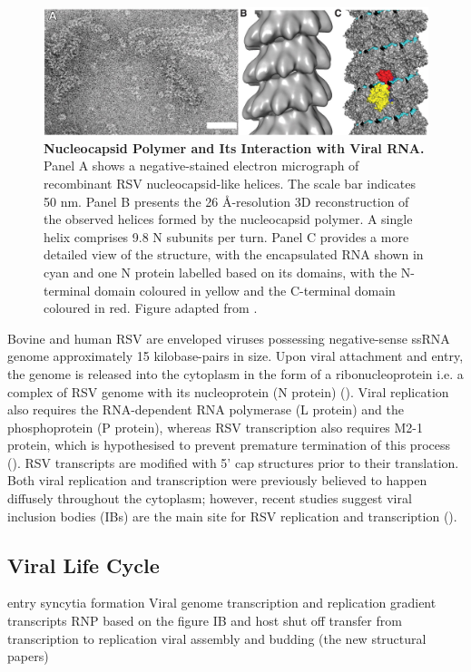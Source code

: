 \begin{figure}
    \centering
    \includegraphics[width=1\linewidth]{04. Introduction//Figs/08. N-structure.jpeg}
    \caption[Nucleocapsid Polymer and Its Interaction with Viral RNA.]{\textbf{Nucleocapsid Polymer and Its Interaction with Viral RNA.} Panel A shows a negative-stained electron micrograph of recombinant RSV nucleocapsid-like helices. The scale bar indicates 50 nm. Panel B presents the 26 \r{A}-resolution 3D reconstruction of the observed helices formed by the nucleocapsid polymer. A single helix comprises 9.8 N subunits per turn. Panel C provides a more detailed view of the structure, with the encapsulated RNA shown in cyan and one N protein labelled based on its domains, with the N-terminal domain coloured in yellow and the C-terminal domain coloured in red. Figure adapted from \cite{Tawar2009CrystalVirus}.}
    \label{fig:Nucleocapsid Polymer and Its Interaction with Viral RNA}
\end{figure}

Bovine and human RSV are enveloped viruses possessing negative-sense ssRNA genome approximately 15 kilobase-pairs in size. Upon viral attachment and entry, the genome is released into the cytoplasm in the form of a ribonucleoprotein i.e. a complex of RSV genome with its nucleoprotein (N protein) (\cite{Noton2015InitiationReplication}). Viral replication also requires the RNA-dependent RNA polymerase (L protein) and the phosphoprotein (P protein), whereas RSV transcription also requires M2-1 protein, which is hypothesised to prevent premature termination of this process (\cite{Tanner2014CrystalPhosphorylation}). RSV transcripts are modified with 5' cap structures prior to their translation. Both viral replication and transcription were previously believed to happen diffusely throughout the cytoplasm; however, recent studies suggest viral inclusion bodies (IBs) are the main site for RSV replication and transcription (\cite{Rincheval2017FunctionalVirus}). 

\subsection{Viral Life Cycle} \label{subsec:Viral Life Cycle}
entry
syncytia formation
Viral genome transcription and replication 
gradient transcripts
RNP based on the figure
IB and host shut off
transfer from transcription to replication
viral assembly and budding (the new structural papers)


